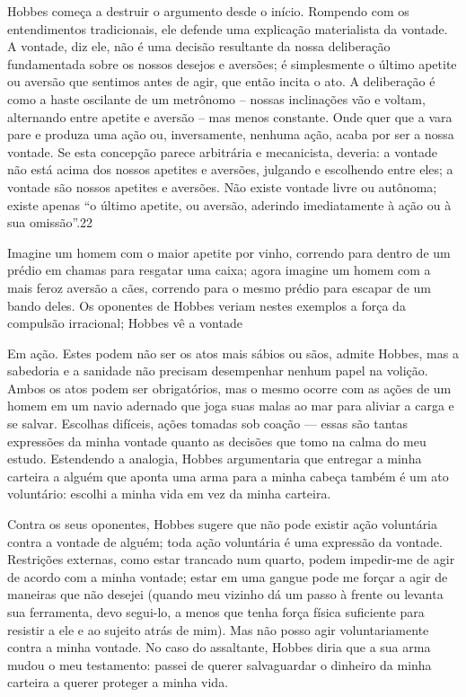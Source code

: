  \par 
Hobbes começa a destruir o argumento desde o início. Rompendo com os entendimentos tradicionais, ele defende uma explicação materialista da vontade. A vontade, diz ele, não é uma decisão resultante da nossa deliberação fundamentada sobre os nossos desejos e aversões; é simplesmente o último apetite ou aversão que sentimos antes de agir, que então incita o ato. A deliberação é como a haste oscilante de um metrônomo – nossas inclinações vão e voltam, alternando entre apetite e aversão – mas menos constante. Onde quer que a vara pare e produza uma ação ou, inversamente, nenhuma ação, acaba por ser a nossa vontade. Se esta concepção parece arbitrária e mecanicista, deveria: a vontade não está acima dos nossos apetites e aversões, julgando e escolhendo entre eles; a vontade são nossos apetites e aversões. Não existe vontade livre ou autônoma; existe apenas “o último apetite, ou aversão, aderindo imediatamente à ação ou à sua omissão”.{\color{blue}22}
 \par 
Imagine um homem com o maior apetite por vinho, correndo para dentro de um prédio em chamas para resgatar uma caixa; agora imagine um homem com a mais feroz aversão a cães, correndo para o mesmo prédio para escapar de um bando deles. Os oponentes de Hobbes veriam nestes exemplos a força da compulsão irracional; Hobbes vê a vontade
 \par 
Em ação. Estes podem não ser os atos mais sábios ou sãos, admite Hobbes, mas a sabedoria e a sanidade não precisam desempenhar nenhum papel na volição. Ambos os atos podem ser obrigatórios, mas o mesmo ocorre com as ações de um homem em um navio adernado que joga suas malas ao mar para aliviar a carga e se salvar. Escolhas difíceis, ações tomadas sob coação — essas são tantas expressões da minha vontade quanto as decisões que tomo na calma do meu estudo. Estendendo a analogia, Hobbes argumentaria que entregar a minha carteira a alguém que aponta uma arma para a minha cabeça também é um ato voluntário: escolhi a minha vida em vez da minha carteira.
 \par 
Contra os seus oponentes, Hobbes sugere que não pode existir ação voluntária contra a vontade de alguém; toda ação voluntária é uma expressão da vontade. Restrições externas, como estar trancado num quarto, podem impedir-me de agir de acordo com a minha vontade; estar em uma gangue pode me forçar a agir de maneiras que não desejei (quando meu vizinho dá um passo à frente ou levanta sua ferramenta, devo segui-lo, a menos que tenha força física suficiente para resistir a ele e ao sujeito atrás de mim). Mas não posso agir voluntariamente contra a minha vontade. No caso do assaltante, Hobbes diria que a sua arma mudou o meu testamento: passei de querer salvaguardar o dinheiro da minha carteira a querer proteger a minha vida.
